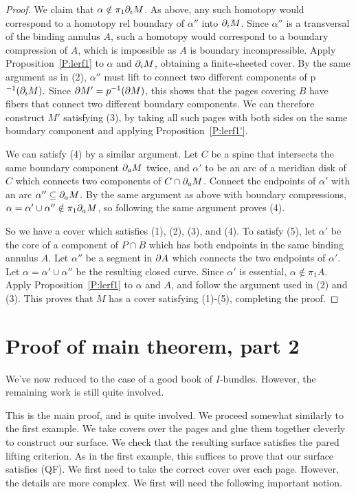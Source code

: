 \begin{proof}
We claim that $\alpha \notin \pi_1 \partial_i M$. As above, any such homotopy would
correspond to a homotopy rel boundary of $\alpha''$ into $\partial_i M$. Since
$\alpha''$ is a transversal of the binding annulus $A$, such a homotopy would
correspond to a boundary compression of $A$, which is impossible as $A$ is
boundary incompressible. Apply Proposition~\ref{P:lerf1} to $\alpha$ and $\partial_i
M$, obtaining a finite-sheeted cover. By the same argument as in (2),
$\alpha''$ must lift to connect two different components of p$^{-1}(\partial_i M).$
Since $\partial M' = p^{-1}(\partial M)$, this shows that the pages covering $B$ have
fibers that connect two different boundary components. We can therefore
construct $M'$ satisfying (3), by taking all such pages with both sides on the
same boundary component and applying Proposition~\ref{P:lerf1'}.

We can satisfy (4) by a similar argument. Let $C$ be a spine that intersects
the same boundary component $\partial_a M$ twice, and $\alpha'$ to be an arc of
a meridian disk of $C$ which connects two components of $C \cap \partial_a M$.
Connect the endpoints of $\alpha'$ with an arc $\alpha'' \subseteq \partial_a M$. By the
same argument as above with boundary compressions, $\alpha=\alpha' \cup
\alpha'' \notin \pi_1 \partial_a M$, so following the same argument proves (4).

So we have a cover which satisfies (1), (2), (3), and (4). To satisfy (5), let
$\alpha'$ be the core of a component of $P \cap B$ which has both endpoints in
the same binding annulus $A$. Let $\alpha''$ be a segment in $\partial A$ which
connects the two endpoints of $\alpha'$. Let $\alpha = \alpha' \cup \alpha''$
be the resulting closed curve. Since $\alpha'$ is essential, $\alpha \notin
\pi_1A$.  Apply Proposition~\ref{P:lerf1} to $\alpha$ and $A$, and follow the
argument used in (2) and (3).  This proves that $M$ has a cover satisfying
(1)-(5), completing the proof.

\end{proof}

\section{Proof of main theorem, part 2}

We've now reduced to the case of a good book of $I$-bundles. However, the
remaining work is still quite involved.

This is the main proof, and is quite involved. We proceed somewhat similarly to
the first example. We take covers over the pages and glue them together
cleverly to construct our surface. We check that the resulting surface
satisfies the pared lifting criterion. As in the first example, this suffices
to prove that our surface satisfies (QF).  We first need to take the correct
cover over each page. However, the details are more complex. We first will need
the following important notion.

